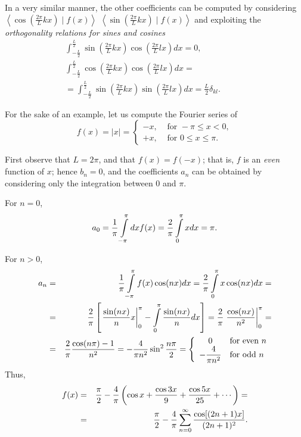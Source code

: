 {In a very similar manner, the other coefficients can be computed by considering
$\left\langle   \cos \left(\frac{2\pi }{L}kx\right)  \mid f(x) \right\rangle$
$\left\langle   \sin \left(\frac{2\pi }{L}kx\right)  \mid f(x) \right\rangle$
and exploiting the
{\em orthogonality relations for sines and cosines}
\begin{equation}
\begin{split}
\int_{-\frac{L}{2}}^\frac{L}{2}
\sin\left(\frac{2\pi }{L}kx\right)
\cos\left(\frac{2\pi }{L}lx\right)
dx
=0,\\
\int_{-\frac{L}{2}}^\frac{L}{2}
\cos\left(\frac{2\pi }{L}kx\right)
\cos\left(\frac{2\pi }{L}lx\right)
dx   =
\qquad \qquad \qquad \\
=
\int_{-\frac{L}{2}}^\frac{L}{2}
\sin\left(\frac{2\pi }{L}kx\right)
\sin\left(\frac{2\pi }{L}lx\right)
dx
=\frac{L}{2}\delta_{kl}.
\end{split}
\label{2012-m-ch-orsc}
\end{equation}



\eproof
}

{
\color{blue}
\bexample
For the sake of an example, let us compute the  Fourier series of
$$
f(x)=\vert x\vert
=
\begin{cases}
 -x, & \textrm{ for }  -\pi \le x<0 ,\\
 +x, & \textrm{ for }  0\le x\le \pi  .
\end{cases}
$$

First observe that $L=2\pi$, and that
$f(x)=f(-x)$; that is, $f$ is an {\em even} function of $x$;
hence
$b_n=0$, and the coefficients $a_n$ can be obtained by considering only the integration
between $0$ and $\pi$.

For $n=0$,
$$a_0={1\over\pi}\int\limits_{-\pi}^\pi dxf(x)={2\over\pi}
\int\limits_0^\pi xdx=\pi.$$

For $n>0$,
\begin{eqnarray*}
   a_n&=&{1\over\pi}\int\limits_{-\pi}^\pi f(x)\cos(nx)dx=
         {2\over\pi}\int\limits_0^\pi x\cos(nx)dx=\\
      &=&{2\over\pi}\left[\left.{\sin(nx)\over n}x\right|_0^\pi-
         \int\limits_0^\pi{\sin(nx)\over n}dx\right]={2\over\pi}\left.
         {\cos(nx)\over n^2}\right|_0^\pi=\\
      &=&{2\over\pi}{\cos(n\pi)-1\over n^2}=-{4\over\pi n^2}\sin^2{n\pi\over2}=
         \left\{\begin{array}{cl}
              0&\mbox{for even $n$}\\
              \displaystyle-{4\over\pi n^2}&\mbox{for odd $n$}
              \end{array}\right.
\end{eqnarray*}
Thus,
\begin{eqnarray*}
    f(x)&=&{\pi\over2}-{4\over\pi}\left(\cos x+
               {\cos 3x\over9}+{\cos 5x\over 25}+\cdots\right)=\\
            &=&{\pi\over2}-{4\over\pi}\sum_{n=0}^\infty
               {\cos[(2n+1)x]\over(2n+1)^2}.
\end{eqnarray*}

\eexample
}

